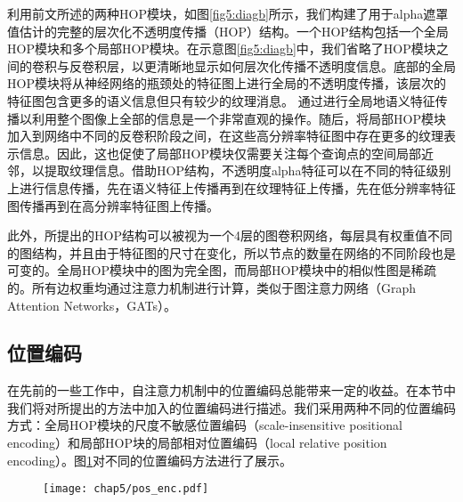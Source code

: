 利用前文所述的两种HOP模块，如图\ref{fig5:diagb}所示，我们构建了用于alpha遮罩值估计的完整的层次化不透明度传播（HOP）结构。一个HOP结构包括一个全局HOP模块和多个局部HOP模块。在示意图\ref{fig5:diagb}中，我们省略了HOP模块之间的卷积与反卷积层，以更清晰地显示如何层次化传播不透明度信息。底部的全局HOP模块将从神经网络的瓶颈处的特征图上进行全局的不透明度传播，该层次的特征图包含更多的语义信息但只有较少的纹理消息。
通过进行全局地语义特征传播以利用整个图像上全部的信息是一个非常直观的操作。随后，将局部HOP模块加入到网络中不同的反卷积阶段之间，在这些高分辨率特征图中存在更多的纹理表示信息。因此，这也促使了局部HOP模块仅需要关注每个查询点的空间局部近邻，以提取纹理信息。借助HOP结构，不透明度alpha特征可以在不同的特征级别上进行信息传播，先在语义特征上传播再到在纹理特征上传播，先在低分辨率特征图传播再到在高分辨率特征图上传播。

此外，所提出的HOP结构可以被视为一个4层的图卷积网络\cite{kipf2016semi}，每层具有权重值不同的图结构，并且由于特征图的尺寸在变化，所以节点的数量在网络的不同阶段也是可变的。全局HOP模块中的图为完全图，而局部HOP模块中的相似性图是稀疏的。所有边权重均通过注意力机制进行计算，类似于图注意力网络（Graph Attention Networks，GATs）\cite{velivckovic2017graph}。

\subsection{位置编码}
在先前的一些工作中，自注意力机制中的位置编码总能带来一定的收益\cite{vaswani2017attention,dai2019transformer,ramachandran2019stand}。在本节中我们将对所提出的方法中加入的位置编码进行描述。我们采用两种不同的位置编码方式：全局HOP模块的尺度不敏感位置编码（scale-insensitive positional encoding）和局部HOP块的局部相对位置编码（local relative position encoding）。图\ref{fig5:PE}对不同的位置编码方法进行了展示。

\begin{figure}[t]
	\texttt{[image: chap5/pos\_enc.pdf]}
	\label{fig5:PE}
\end{figure}

